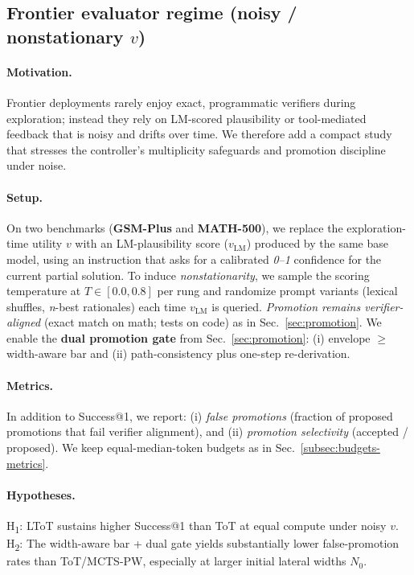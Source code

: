 \documentclass{article}
\begin{document}
\subsection{Frontier evaluator regime (noisy / nonstationary $v$)}
\label{subsec:frontier-eval}

\paragraph{Motivation.}
Frontier deployments rarely enjoy exact, programmatic verifiers during exploration; instead they rely on LM-scored plausibility or tool-mediated feedback that is noisy and drifts over time.
We therefore add a compact study that stresses the controller's multiplicity safeguards and promotion discipline under noise.

\paragraph{Setup.}
On two benchmarks (\textbf{GSM-Plus} and \textbf{MATH-500}), we replace the exploration-time utility $v$ with an LM-plausibility score ($v_{\text{LM}}$) produced by the same base model, using an instruction that asks for a calibrated \emph{0--1} confidence for the current partial solution.
To induce \emph{nonstationarity}, we sample the scoring temperature at $T{\in}[0.0,0.8]$ per rung and randomize prompt variants (lexical shuffles, \emph{n}-best rationales) each time $v_{\text{LM}}$ is queried.
\emph{Promotion remains verifier-aligned} (exact match on math; tests on code) as in Sec.~\ref{sec:promotion}.
We enable the \textbf{dual promotion gate} from Sec.~\ref{sec:promotion}: (i) envelope $\ge$ width-aware bar and (ii) path-consistency plus one-step re-derivation.

\paragraph{Metrics.}
In addition to Success@1, we report: (i) \emph{false promotions} (fraction of proposed promotions that fail verifier alignment), and (ii) \emph{promotion selectivity} (accepted / proposed).
We keep equal-median-token budgets as in Sec.~\ref{subsec:budgets-metrics}.

\paragraph{Hypotheses.}
H\textsubscript{1}: LToT sustains higher Success@1 than ToT at equal compute under noisy $v$.
H\textsubscript{2}: The width-aware bar + dual gate yields substantially lower false-promotion rates than ToT/MCTS-PW, especially at larger initial lateral widths $N_0$.
\end{document}
